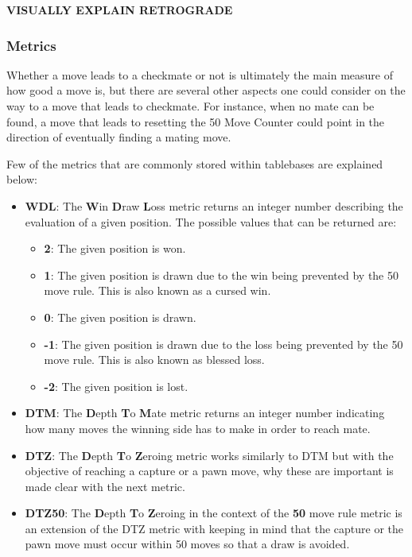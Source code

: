 \textbf{VISUALLY EXPLAIN RETROGRADE}

\subsubsection{Metrics}
Whether a move leads to a checkmate or not is ultimately the main measure of how good a move is, but there are several other aspects one could consider on the way to a move that leads to checkmate. For instance, when no mate can be found, a move that leads to resetting the 50 Move Counter \cite{50Draw} could point in the direction of eventually finding a mating move.

\newpage

Few of the metrics that are commonly stored within tablebases are explained below:

\begin{itemize}
    \item \textbf{WDL}: The \textbf{W}in \textbf{D}raw \textbf{L}oss metric returns an integer number describing the evaluation of a given position. The possible values that can be returned are:
        \begin{itemize}
            \item \textbf{2}: The given position is won.
            \item \textbf{1}: The given position is drawn due to the win being prevented by the 50 move rule. This is also known as a cursed win.
            \item \textbf{0}: The given position is drawn.
            \item \textbf{-1}: The given position is drawn due to the loss being prevented by the 50 move rule. This is also known as blessed loss.
            \item \textbf{-2}: The given position is lost.
        \end{itemize}
    \item \textbf{DTM}: The \textbf{D}epth \textbf{T}o \textbf{M}ate metric returns an integer number indicating how many moves the winning side has to make in order to reach mate.
    \item \textbf{DTZ}: The \textbf{D}epth \textbf{T}o \textbf{Z}eroing metric works similarly to DTM but with the objective of reaching a capture or a pawn move, why these are important is made clear with the next metric.
    \item \textbf{DTZ50}: The \textbf{D}epth \textbf{T}o \textbf{Z}eroing in the context of the \textbf{50} move rule metric is an extension of the DTZ metric with keeping in mind that the capture or the pawn move must occur within 50 moves so that a draw is avoided.
\end{itemize}

